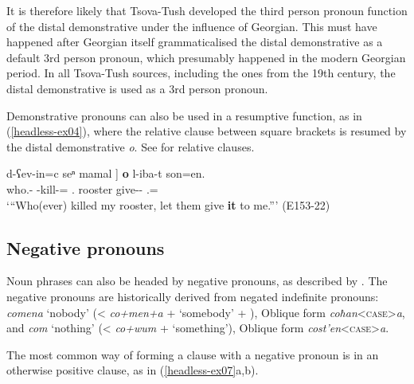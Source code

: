 It is therefore likely that Tsova-Tush developed the third person pronoun function of the distal demonstrative under the influence of Georgian. This must have happened after Georgian itself grammaticalised the distal demonstrative as a default 3rd person pronoun, which presumably happened in the modern Georgian period. In all Tsova-Tush sources, including the ones from the 19th century, the distal demonstrative is used as a 3rd person pronoun.

Demonstrative pronouns can also be used in a resumptive function, as in (\ref{headless-ex04}), where the relative clause between square brackets is resumed by the distal demonstrative \textit{o}. See  for relative clauses.

\begin{exe}
	\ex\label{headless-ex04}
	\gll {{\normalfont[} ħan-e} d-ʕev-in=c seⁿ {mamal {\normalfont]}} \textbf{o} l-iba-t son=en. \\
	who.{\Erg}-{\Rel} {\D}-kill-{\Aor}={\Subord} {\Fsg}.{\Gen} rooster \textbf{{\Dist}} give-{\Imp}-{\Pl} {\Fsg}.{\Dat}={\Quot} \\
	\trans `{``}Who(ever) killed my rooster, let them give \textbf{it} to me.{''}'
	\hfill (E153-22)
\end{exe}

\subsection{Negative pronouns} \label{negpro}

Noun phrases can also be headed by negative pronouns, as described by \textcite[202]{ankernegation,mikeladze11}. The negative pronouns are historically derived from negated indefinite pronouns: \textit{comena} `nobody' (< \textit{co+men+a} {\Neg}+ `somebody' + {\Emph}), Oblique form \textit{coħan}<\textsc{case}>\textit{a}, and \textit{com} `nothing' (< \textit{co+wum} {\Neg} + `something'), Oblique form \textit{cost'en}<\textsc{case}>\textit{a}. 

The most common way of forming a clause with a negative pronoun is in an otherwise positive clause, as in (\ref{headless-ex07}a,b).

